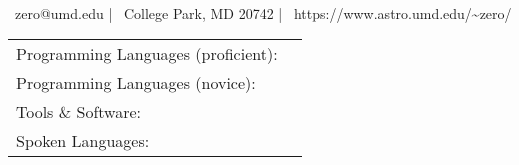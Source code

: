 \documentclass[]{awesome-cv}
\begin{document}
    
\begin{center}
	  \\
	\vspace{2mm}
	{\faEnvelope\ zero@umd.edu} | {\faMapMarker\ College Park, MD 20742} | {\faLink\ https://www.astro.umd.edu/\textasciitilde{}zero/}
\end{center}


\begin{cventries}
	\cventry
	{}
	{\def\arraystretch{1.15}{\begin{tabular}{ l l }
		Programming Languages (proficient):  & {\skill{ Python, C, \LaTeX, Mathematica, shell scripting}} \\
		Programming Languages (novice):  & {\skill{ HTML/CSS}} \\
		Tools \& Software:  & {\skill{ Unix/Linux, Slurm, Numpy, Matplotlib, Jupyter Notebook, Microsoft Office, Git}} \\
		Spoken Languages:  & {\skill{ English (native), Hebrew (advanced)}}
		\end{tabular}}}
	{}
	{}
	{}
\end{cventries}

\vspace{-9mm}
\end{document}
